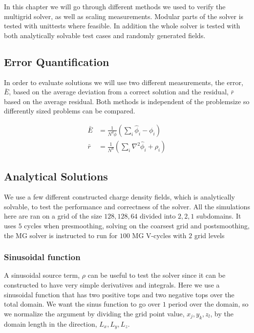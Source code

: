 In this chapter we will go through different methods we used to verify the multigrid
solver, as well as scaling measurements. Modular parts of the solver is tested with unittests
where feasible. In addition the whole solver is tested with both analytically solvable
test cases and randomly generated fields.

\subsection{Error Quantification}
	In order to evaluate solutions we will use two different measurements, the error, \(\bar{E}\), based
	on the average deviation from a correct solution and the residual, \(\bar{r}\) based on the average
	residual. Both methods is independent of the problemsize so differently sized problems can be compared.

	\begin{align}
		\bar{E} &= \frac{1}{N^d\bar{\phi}}\left( \sum_i{\hat{\phi}_i - \phi_i} \right)
		\\
		\bar{r} &= \frac{1}{N^d}\left( \sum_i{ \nabla^2 \hat{\phi}_i + \rho_i  }  \right)
	\end{align}

	\subsection{Analytical Solutions}
		We use a few different constructed charge density fields, which is analytically solvable,
		to test the performance and correctness of the solver. All the simulations here are ran on
		a grid of the size \( 128, 128, 64 \) divided into \(2,2,1\) subdomains.
 		It uses \(5\) cycles when presmoothing, solving on the coarsest grid and postsmoothing, the
		MG solver is instructed to run for \(100\) MG V-cycles with \(2\) grid levels

	\subsubsection{Sinusoidal function}
		\label{sec:sinusoidal}
		A sinusoidal source term, \(\rho\) can be useful to test the solver since
		it can be constructed to have very simple derivatives and integrals. Here
		we use a sinusoidal function that has two positive tops and two negative tops
		over the total domain. We want the sinus function to go over \(1\) period
		over the domain, so we normalize the argument by dividing the grid point
		value, \(x_j, y_k, z_l\), by the domain length in the direction, \(L_x, L_y, L_z\).

